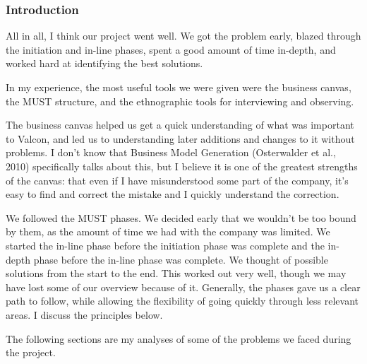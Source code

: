 \subsubsection{Introduction}
All in all, I think our project went well.
We got the problem early, blazed through the initiation and in-line phases, spent a good amount of time in-depth, and worked hard at identifying the best solutions.

In my experience, the most useful tools we were given were the business canvas, the MUST structure, and the ethnographic tools for interviewing and observing.

The business canvas helped us get a quick understanding of what was important to Valcon, and led us to understanding later additions and changes to it without problems.
I don't know that Business Model Generation (Osterwalder et al., 2010) specifically talks about this, but I believe it is one of the greatest strengths of the canvas: that even if I have misunderstood some part of the company, it's easy to find and correct the mistake and I quickly understand the correction.

We followed the MUST phases.
We decided early that we wouldn't be too bound by them, as the amount of time we had with the company was limited.
We started the in-line phase before the initiation phase was complete and the in-depth phase before the in-line phase was complete.
We thought of possible solutions from the start to the end.
This worked out very well, though we may have lost some of our overview because of it.
Generally, the phases gave us a clear path to follow, while allowing the flexibility of going quickly through less relevant areas.
I discuss the principles below.

The following sections are my analyses of some of the problems we faced during the project.